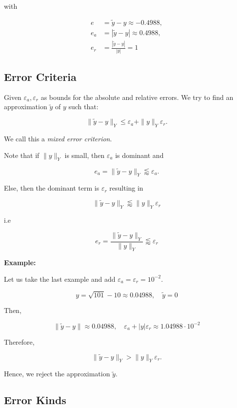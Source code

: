 with 

\begin{align*}    
    e &= \tilde{y} - y \approx -0.4988, \\ 
    e_a &= |\tilde{y} - y| \approx 0.4988, \\ 
    e_r &= \frac{|\tilde{y} - y|}{|y|} = 1
\end{align*}

\subsection{Error Criteria}

Given \(\varepsilon_a, \varepsilon_{r}\) as bounds for the absolute and relative errors. We try 
to find an approximation \(\tilde{y}\) of \(y\) such that: 

\[
    \|\tilde{y} - y \|_Y \le \varepsilon_a + \|y\|_Y \varepsilon_r.
\]

We call this a \emph{mixed error criterion}.

Note that if \(\|y\|_Y\) is small, then \(\varepsilon_a\) is dominant and 

\[
    e_a = \|\tilde{y} - y \|_Y \lessapprox \varepsilon_a.
\]

Else, then the dominant term is \(\varepsilon_r\) resulting in

\[
    \|\tilde{y} - y \|_Y  \lessapprox \|y\|_Y \varepsilon_r 
\]

i.e 

\[
    e_r = \frac{\|\tilde{y} - y \|_Y }{\|y\|_Y} \lessapprox \varepsilon_r
\]

\textbf{Example:}

Let us take the last example and add \(\varepsilon_a = \varepsilon_r = 10^{-2}\). 

\[
    y = \sqrt{101} - 10 \approx 0.04988, \quad \tilde{y} = 0
\]

Then, 

\[
    \|\tilde{y} - y \| \approx 0.04988, \quad \varepsilon_a + |y|\varepsilon_r \approx 1.04988 \cdot 10^{-2}
\]

Therefore, 

\[
    \|\tilde{y} - y \|_Y  > \|y\|_Y \varepsilon_r.
\]

Hence, we reject the approximation \(\tilde{y}\). 

\subsection{Error Kinds}

